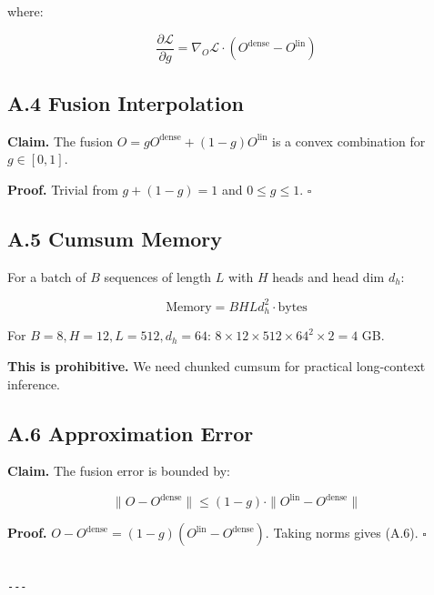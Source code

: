 where:

\[
\frac{\partial \mathcal{L}}{\partial g} = \nabla_O \mathcal{L} \cdot (O^\text{dense} - O^\text{lin})
\]

\subsection{A.4 Fusion Interpolation}

\textbf{Claim.} The fusion $O = g O^\text{dense} + (1 - g) O^\text{lin}$ is a 
convex combination for $g \in [0, 1]$.

\textbf{Proof.} Trivial from $g + (1 - g) = 1$ and $0 \le g \le 1$. $\square$

\subsection{A.5 Cumsum Memory}

For a batch of $B$ sequences of length $L$ with $H$ heads and head dim $d_h$:

\[
\text{Memory} = B H L d_h^2 \cdot \text{bytes}
\]

For $B = 8, H = 12, L = 512, d_h = 64$: $8 \times 12 \times 512 \times 64^2 \times 2 = 4$ GB. 

\textbf{This is prohibitive.} We need chunked cumsum for practical long-context 
inference.

\subsection{A.6 Approximation Error}

\textbf{Claim.} The fusion error is bounded by:

\[
\|O - O^\text{dense}\| \leq (1 - g) \cdot \|O^\text{lin} - O^\text{dense}\|
\]

\textbf{Proof.} $O - O^\text{dense} = (1 - g)(O^\text{lin} - O^\text{dense})$. 
Taking norms gives (A.6). $\square$
\begin{lstlisting}

---
\end{lstlisting}